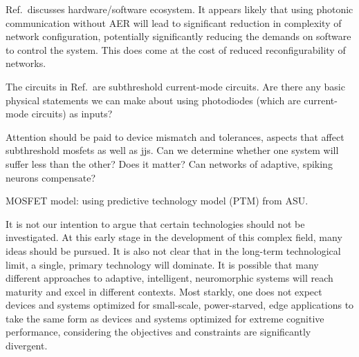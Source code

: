 \documentclass[onecolumn]{article}
\begin{document}
Ref.\,\cite{chst2014} discusses hardware/software ecosystem. It appears likely that using photonic communication without AER will lead to significant reduction in complexity of network configuration, potentially significantly reducing the demands on software to control the system. This does come at the cost of reduced reconfigurability of networks.

The circuits in Ref.\,\cite{chst2014} are subthreshold current-mode circuits. Are there any basic physical statements we can make about using photodiodes (which are current-mode circuits) as inputs?

Attention should be paid to device mismatch and tolerances, aspects that affect subthreshold mosfets as well as jjs. Can we determine whether one system will suffer less than the other? Does it matter? Can networks of adaptive, spiking neurons compensate?

MOSFET model: using predictive technology model (PTM) from ASU.

It is not our intention to argue that certain technologies should not be investigated. At this early stage in the development of this complex field, many ideas should be pursued. It is also not clear that in the long-term technological limit, a single, primary technology will dominate. It is possible that many different approaches to adaptive, intelligent, neuromorphic systems will reach maturity and excel in different contexts. Most starkly, one does not expect devices and systems optimized for small-scale, power-starved, edge applications to take the same form as devices and systems optimized for extreme cognitive performance, considering the objectives and constraints are significantly divergent. 
\end{document}
